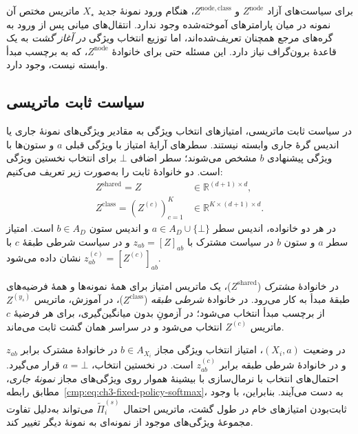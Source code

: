 برای سیاست‌های آزاد $Z^{\mathrm{node}}$ و
$Z^{\mathrm{node,class}}$، هنگام ورود نمونهٔ جدید $X_\star$
ماتریس مختص آن نمونه در میان پارامترهای آموخته‌شده وجود ندارد.
انتقال‌های میانی پس از ورود به گره‌های مرجع همچنان تعریف‌شده‌اند،
اما توزیع انتخاب ویژگی \emph{در آغاز گشت} به یک قاعدهٔ
برون‌گراف نیاز دارد. این مسئله حتی برای خانوادهٔ
$Z^{\mathrm{node}}$، که به برچسب مبدأ وابسته نیست، وجود دارد.


\subsection{سیاست ثابت ماتریسی}
\label{cmp:subsec:ch3-shared-matrix-policy}
در سیاست ثابت ماتریسی، امتیازهای انتخاب ویژگی به
مقادیر ویژگی‌های نمونهٔ جاری یا اندیس گرهٔ جاری وابسته نیستند.
سطرهای آرایهٔ امتیاز با ویژگی قبلی $a$ و ستون‌ها با
ویژگی پیشنهادی $b$ مشخص می‌شوند؛ سطر اضافی $\bot$
برای انتخاب نخستین ویژگی است. دو خانوادهٔ ثابت را
به‌صورت زیر تعریف می‌کنیم:
\begin{equation}\label{cmp:eq:ch3-fixed-policy-matrix}
\begin{aligned}
Z^{\mathrm{shared}}=Z
&\in\mathbb R^{(d+1)\times d},\\
Z^{\mathrm{class}}=(Z^{(c)})_{c=1}^{K}
&\in\mathbb R^{K\times(d+1)\times d}.
\end{aligned}
\end{equation}
در هر دو خانواده، اندیس سطر $a\in A_D\cup\{\bot\}$ و
اندیس ستون $b\in A_D$ است. امتیاز سطر $a$ و ستون $b$
در سیاست مشترک با $z_{ab}=[Z]_{ab}$ و در سیاست
شرطی طبقهٔ $c$ با $z^{(c)}_{ab}=[Z^{(c)}]_{ab}$
نشان داده می‌شود.

در خانوادهٔ \emph{مشترک} ($Z^{\mathrm{shared}}$)، یک ماتریس
امتیاز برای همهٔ نمونه‌ها و همهٔ فرضیه‌های طبقهٔ مبدأ به کار
می‌رود. در خانوادهٔ \emph{شرطی طبقه} ($Z^{\mathrm{class}}$)،
در آموزش، ماتریس $Z^{(y_s)}$ از برچسب مبدأ
انتخاب می‌شود؛ در آزمونِ بدون میانگین‌گیری، برای هر
فرضیهٔ $c$ ماتریس $Z^{(c)}$ انتخاب می‌شود و در
سراسر همان گشت ثابت می‌ماند.

در وضعیت $(X_i,a)$، امتیاز انتخاب ویژگی مجاز $b\in A_{X_i}$
در خانوادهٔ مشترک برابر $z_{ab}$ و در خانوادهٔ شرطی طبقه
برابر $z^{(c)}_{ab}$ است. در نخستین انتخاب، $a=\bot$
قرار می‌گیرد. احتمال‌های انتخاب با نرمال‌سازی با بیشینهٔ هموار
روی ویژگی‌های مجاز \emph{نمونهٔ جاری}، مطابق
رابطه~\eqref{cmp:eq:ch3-fixed-policy-softmax}، به دست می‌آیند.
بنابراین، با وجود ثابت‌بودن امتیازهای خام در طول گشت،
ماتریس احتمال $\widetilde\Pi_i^{(s)}$ می‌تواند به‌دلیل تفاوت
مجموعهٔ ویژگی‌های موجود از نمونه‌ای به نمونهٔ دیگر تغییر کند.

